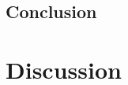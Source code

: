             

        \subsection{Conclusion} \label{sec:test_conclusion}
            
        
    \section{Discussion} \label{sec:subsequent_motion_correction_using_advanced_reconstruction_and_gating_methods_with_more_challenging_data_discussion}
        
